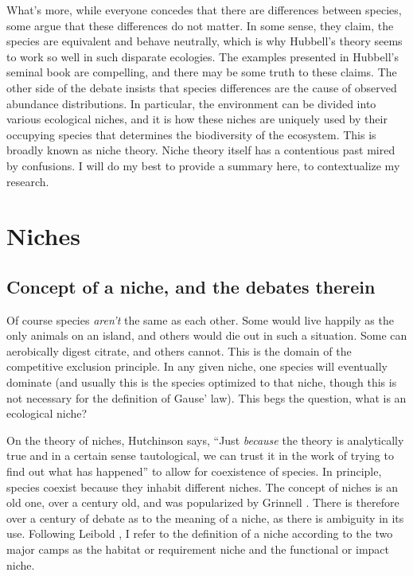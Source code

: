 \documentclass[a4paper,11pt]{article}
\numberwithin{equation}{section} %
\begin{document}
What's more, while everyone concedes that there are differences between species, some argue that these differences do not matter. 
In some sense, they claim, the species are equivalent and behave neutrally, which is why Hubbell's theory seems to work so well in such disparate ecologies. 
The examples presented in Hubbell's seminal book are compelling, and there may be some truth to these claims. 
The other side of the debate insists that species differences are the cause of observed abundance distributions. 
In particular, the environment can be divided into various ecological niches, and it is how these niches are uniquely used by their occupying species that determines the biodiversity of the ecosystem. 
This is broadly known as niche theory. 
Niche theory itself has a contentious past mired by confusions. 
I will do my best to provide a summary here, to contextualize my research. 




\section{Niches}
\subsection{Concept of a niche, and the debates therein}
Of course species \emph{aren't} the same as each other. 
Some would live happily as the only animals on an island, and others would die out in such a situation. 
Some can aerobically digest citrate, and others cannot. 
This is the domain of the competitive exclusion principle. In any given niche, one species will eventually dominate (and usually this is the species optimized to that niche, though this is not necessary for the definition of Gause' law). 
This begs the question, what is an ecological niche? 

On the theory of niches, Hutchinson \cite{Hutchinson1957} says, ``Just \emph{because} the theory is analytically true and in a certain sense tautological, we can trust it in the work of trying to find out what has happened'' to allow for coexistence of species. 
In principle, species coexist because they inhabit different niches. 
The concept of niches is an old one, over a century old, and was popularized by Grinnell \cite{Grinnell1917}. 
There is therefore over a century of debate as to the meaning of a niche, as there is ambiguity in its use. 
Following Leibold \cite{Leibold1995}, I refer to the definition of a niche according to the two major camps as the habitat or requirement niche and the functional or impact niche. 
\end{document}
